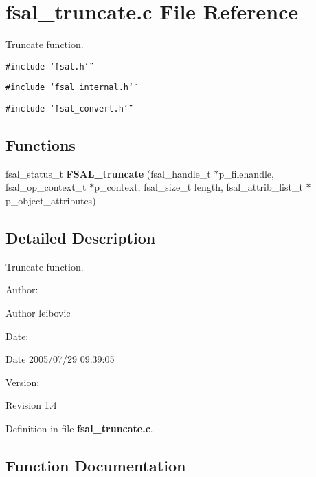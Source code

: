 \section{fsal\_\-truncate.c File Reference}
\label{fsal__truncate_8c}
Truncate function. 

{\tt \#include \char`\"{}fsal.h\char`\"{}}\par
{\tt \#include \char`\"{}fsal\_\-internal.h\char`\"{}}\par
{\tt \#include \char`\"{}fsal\_\-convert.h\char`\"{}}\par
\subsection*{Functions}
\begin{CompactItemize}
\item 
fsal\_\-status\_\-t {\bf FSAL\_\-truncate} (fsal\_\-handle\_\-t $\ast$p\_\-filehandle, fsal\_\-op\_\-context\_\-t $\ast$p\_\-context, fsal\_\-size\_\-t length, fsal\_\-attrib\_\-list\_\-t $\ast$p\_\-object\_\-attributes)
\end{CompactItemize}


\subsection{Detailed Description}
Truncate function. 

\begin{Desc}
\item[Author:]\begin{Desc}
\item[Author]leibovic \end{Desc}
\end{Desc}
\begin{Desc}
\item[Date:]\begin{Desc}
\item[Date]2005/07/29 09:39:05 \end{Desc}
\end{Desc}
\begin{Desc}
\item[Version:]\begin{Desc}
\item[Revision]1.4 \end{Desc}
\end{Desc}


Definition in file {\bf fsal\_\-truncate.c}.

\subsection{Function Documentation}
